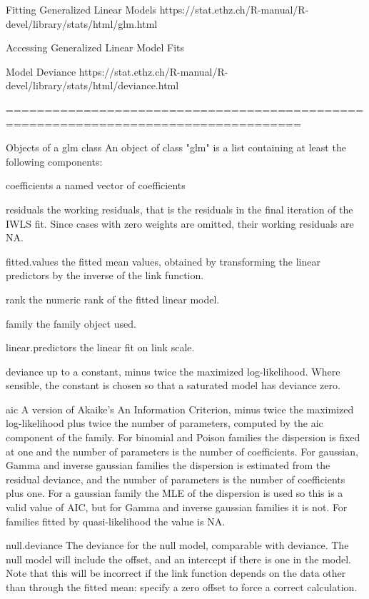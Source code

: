 Fitting Generalized Linear Models
https://stat.ethz.ch/R-manual/R-devel/library/stats/html/glm.html



Accessing Generalized Linear Model Fits



Model Deviance
https://stat.ethz.ch/R-manual/R-devel/library/stats/html/deviance.html

====================================================================================

Objects of a glm class
An object of class "glm" is a list containing at least the following components: 

coefficients a named vector of coefficients
 
residuals the working residuals, that is the residuals in the final iteration of the IWLS fit. Since cases with zero weights are omitted, their working residuals are NA.
 
fitted.values the fitted mean values, obtained by transforming the linear predictors by the inverse of the link function.
 
rank the numeric rank of the fitted linear model.
 
family the family object used.
 
linear.predictors the linear fit on link scale.
 
deviance up to a constant, minus twice the maximized log-likelihood. Where sensible, the constant is chosen so that a saturated model has deviance zero.
 
aic A version of Akaike's An Information Criterion, minus twice the maximized log-likelihood plus twice the number of parameters, computed by the aic component of the family. For binomial and Poison families the dispersion is fixed at one and the number of parameters is the number of coefficients. For gaussian, Gamma and inverse gaussian families the dispersion is estimated from the residual deviance, and the number of parameters is the number of coefficients plus one. For a gaussian family the MLE of the dispersion is used so this is a valid value of AIC, but for Gamma and inverse gaussian families it is not. For families fitted by quasi-likelihood the value is NA.
 
null.deviance The deviance for the null model, comparable with deviance. The null model will include the offset, and an intercept if there is one in the model. Note that this will be incorrect if the link function depends on the data other than through the fitted mean: specify a zero offset to force a correct calculation.
 
